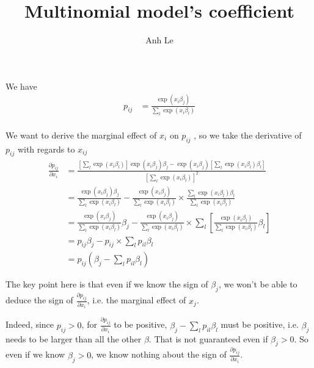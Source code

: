\documentclass[12pt]{article}
\title{Multinomial model's coefficient}
\author{Anh Le}
\begin{document}
\maketitle

We have
\begin{align}
p_{ij} &= \frac{\exp(x_i \beta_j)}{\sum_{l} \exp(x_i \beta_l)} \\
\end{align}

We want to derive the marginal effect of $x_i$ on $p_{ij}$ , so we take the derivative of $p_{ij}$ with regards to $x_{ij}$
\begin{align}
\frac{\partial p_{ij}}{\partial x_i} &= \frac{[\sum_{l} \exp(x_i \beta_l)]\exp(x_i \beta_j) \beta_j - \exp(x_i \beta_j) [\sum_l \exp(x_i \beta_l) \beta_l] }{[\sum_l \exp(x_i \beta_l)]^2} \\
&= \frac{\exp(x_i \beta_j) \beta_j}{\sum_l \exp(x_i \beta_l)} - \frac{\exp(x_i \beta_j) }{\sum_l \exp(x_i \beta_l)} \times \frac{\sum_l \exp(x_i \beta_l) \beta_l}{\sum_l \exp(x_i \beta_l)} \\
&= \frac{\exp(x_i \beta_j)}{\sum_l \exp(x_i \beta_l)} \beta_j - \frac{\exp(x_i \beta_j) }{\sum_l \exp(x_i \beta_l)} \times \sum_l\left[\frac{\exp(x_i \beta_l)}{\sum_l \exp(x_i \beta_l)}\beta_l\right] \\
&= p_{ij} \beta_j - p_{ij} \times \sum_l p_{il} \beta_l \\
&= p_{ij}(\beta_j - \sum_l p_{il} \beta_l)
\end{align}

The key point here is that even if we know the sign of $\beta_j$, we won't be able to deduce the sign of $\frac{\partial p_{ij}}{\partial x_i}$, i.e. the marginal effect of $x_j$. 

Indeed, since $p_{ij} > 0$, for $\frac{\partial p_{ij}}{\partial x_i}$ to be positive, $\beta_j - \sum_l p_{il} \beta_l$ must be positive, i.e. $\beta_j$ needs to be larger than all the other $\beta$. That is not guaranteed even if $\beta_j > 0$. So even if we know $\beta_j > 0$, we know nothing about the sign of $\frac{\partial p_{ij}}{\partial x_i}$.
\end{document}
